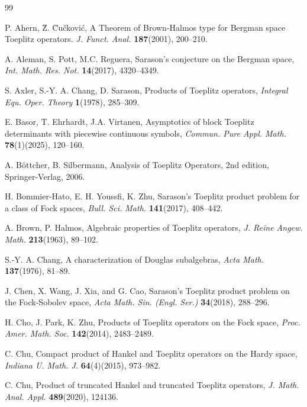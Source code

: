 \documentclass{article}%
\begin{document}
\begin{thebibliography}{99}                                                                                               %


P. Ahern, \u{Z}. \u{C}u\v{c}kovi\'{c}, A Theorem of
Brown-Halmos type for Bergman space Toeplitz operators. \textsl{J. Funct.
Anal.} \textbf{187}(2001), 200--210. \setlength{\parskip}{-2pt}

A. Aleman, S. Pott, M.C. Reguera, Sarason's conjecture on the
Bergman space, \textsl{Int. Math. Res. Not.} \textbf{14}(2017), 4320--4349.

S. Axler, S.-Y. A. Chang, D. Sarason, Products of Toeplitz
operators, \textsl{Integral Equ. Oper. Theory} \textbf{1}(1978), 285--309.

E. Basor, T. Ehrhardt, J.A. Virtanen, Asymptotics of block
Toeplitz determinants with piecewise continuous symbols, \textsl{Commun. Pure
Appl. Math.} \textbf{78}(1)(2025), 120--160.

A. B\"{o}ttcher, B. Silbermann, Analysis of Toeplitz Operators,
2nd edition, Springer-Verlag, 2006.

 H. Bommier-Hato, E. H. Youssﬁ, K. Zhu, Sarason’s Toeplitz product problem for a class of
Fock spaces, \textsl{Bull. Sci. Math.} \textbf{141}(2017), 408–442.

A. Brown, P. Halmos, Algebraic properties of Toeplitz
operators, \textsl{J. Reine Angew. Math.} \textbf{213}(1963), 89--102.

S.-Y. A. Chang, A characterization of Douglas subalgebras,
\textsl{Acta Math.} \textbf{137}(1976), 81--89.

 J. Chen, X. Wang, J. Xia, and G. Cao, Sarason’s Toeplitz product problem on the Fock-Sobolev
space, \textsl{Acta Math. Sin. (Engl. Ser.)} \textbf{34}(2018), 288–296.


H. Cho, J. Park, K. Zhu, Products of Toeplitz operators on
the Fock space, \textsl{Proc. Amer. Math. Soc.} \textbf{142}(2014), 2483--2489.

C. Chu, Compact product of Hankel and Toeplitz operators
on the Hardy space, \textsl{Indiana U. Math. J.} \textbf{64}(4)(2015), 973--982.

C. Chu, Product of truncated Hankel and truncated Toeplitz operators, \textsl{J. Math. Anal. Appl.} \textbf{489}(2020), 124136.


\end{thebibliography}
\end{document}
